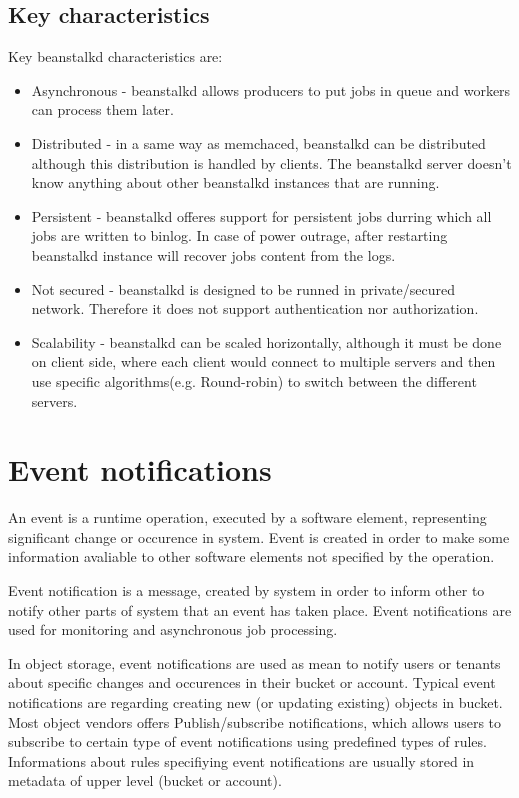     \subsection{Key characteristics}
    Key beanstalkd characteristics are:
    \begin{itemize}
        \item Asynchronous - beanstalkd allows producers to put jobs in queue and workers can process them later.
        \item Distributed - in a same way as memchaced, beanstalkd can be distributed although this distribution is handled by clients. The beanstalkd server doesn't know anything about other beanstalkd instances that are running.
        \item Persistent - beanstalkd offeres support for persistent jobs durring which all jobs are written to binlog. In case of power outrage, after restarting beanstalkd instance will recover jobs content from the logs.
        \item Not secured - beanstalkd is designed to be runned in private/secured network. Therefore it does not support authentication nor authorization.
        \item Scalability - beanstalkd can be scaled horizontally, although it must be done on client side, where each client would connect to multiple servers and then use specific algorithms(e.g. Round-robin) to switch between the different servers.
    \end{itemize}

\section{Event notifications}
    An event is a runtime operation, executed by a software element, representing significant change or occurence in system. Event is created in order to make some information avaliable to other software elements not specified by the operation\cite{eventArchitecturalPatterns}.

    Event notification is a message, created by system in order to inform other to notify other parts of system that an event has taken place\cite{eventRedHatEventDrivenArch}. Event notifications are used for monitoring and asynchronous job processing.

    In object storage, event notifications are used as mean to notify users or tenants about specific changes and occurences in their bucket or account. Typical event notifications are regarding creating new (or updating existing) objects in bucket. Most object vendors offers Publish/subscribe notifications, which allows users to subscribe to certain type of event notifications using predefined types of rules. Informations about rules specifiying event notifications are usually stored in metadata of upper level (bucket or account).


